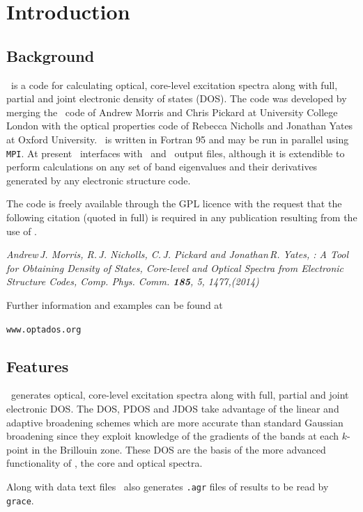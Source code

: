 \documentclass[a4paper,11pt,twoside]{book}
\begin{document}
\chapter{Introduction}\label{chap:introduction}
\section{Background}
\optados\ is a code for calculating optical, core-level excitation spectra along with full, partial and joint electronic density of states (DOS).  The code was developed by merging the \lindos\ code of Andrew Morris and Chris Pickard at University College London with the optical properties code of Rebecca Nicholls and Jonathan Yates at Oxford University.  \optados\ is written in Fortran 95 and may be run in parallel using {\tt MPI}.  At present \optados\ interfaces with \castep\ and \onetep\ output files, although it is extendible to perform calculations on any set of band eigenvalues and their derivatives generated by any electronic structure code.

The code is freely available through the GPL licence with the request that the following citation (quoted in full) is required in any publication resulting from the use of \optados.

\emph{Andrew\,J. Morris, R.\,J. Nicholls, C.\,J. Pickard and Jonathan\,R. Yates, \optados: A Tool for Obtaining Density of States, Core-level and Optical Spectra from Electronic Structure Codes,  Comp. Phys. Comm. {\bf 185}, 5, 1477,(2014)}

\begin{center}
Further information and examples can be found at

\verb#www.optados.org#
\end{center}


\section{Features}
\optados\ generates optical, core-level excitation spectra along with full, partial and joint electronic DOS. The DOS, PDOS and JDOS take advantage of the linear and adaptive broadening schemes which are more accurate than standard Gaussian broadening since they exploit knowledge of the gradients of the bands at each $k$-point in the Brillouin zone.  These DOS are the basis of the more advanced functionality of \optados, the core and optical spectra.

Along with data text files \optados\ also generates \verb#.agr# files of results to be read by \verb#grace#. 
\end{document}
